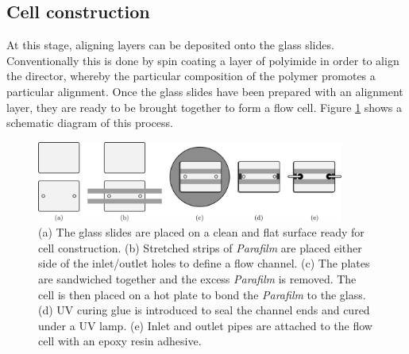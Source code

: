 \subsection{Cell construction}
\label{sec:cell_construction}
At this stage, aligning layers can be deposited onto the glass slides. Conventionally this is done by spin coating a layer of polyimide in order to align the director, whereby the particular composition of the polymer promotes a particular alignment. Once the glass slides have been prepared with an alignment layer, they are ready to be brought together to form a flow cell. Figure \ref{fig:cell_fabrication} shows a schematic diagram of this process. 

\begin{figure}
\begin{center}
\includegraphics[width=0.9\textwidth]{Figures/45/cell_fabrication}
\end{center}
\caption[Cell fabrication]{\label{fig:cell_fabrication}(a) The glass slides are placed on a clean and flat surface ready for cell construction. (b) Stretched strips of \textit{Parafilm} are placed either side of the inlet/outlet holes to define a flow channel. (c) The plates are sandwiched together and the excess \textit{Parafilm} is removed. The cell is then placed on a hot plate to bond the  \textit{Parafilm} to the glass. (d) UV curing glue is introduced to seal the channel ends and cured under a UV lamp. (e) Inlet and outlet pipes are attached to the flow cell with an epoxy resin adhesive.}
\end{figure}


